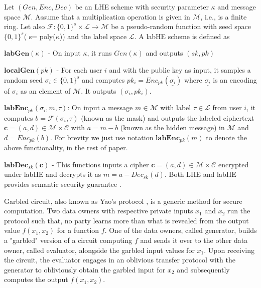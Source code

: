 Let $(Gen,Enc,Dec)$ be an \textsf{LHE} scheme with security parameter $\kappa$ and message space $\mathcal{M}$. Assume that a multiplication operation is given in $\mathcal{M}$, i.e., is a finite ring. Let also $\mathcal{F}:\{0,1\}^s \times \mathcal{L}\rightarrow \mathcal{M}$ be a pseudo-random function with seed space $\{0,1\}^s$( s= poly($\kappa $)) and the label space $\mathcal{L}$. A \textsf{labHE} scheme is defined as
\squishlist
 \item $\textbf{labGen}(\kappa)$ - On input $\kappa$, it runs $Gen(\kappa)$ and outputs $(sk,pk)$
\item $\textbf{localGen}(pk)$ -  For each user $i$ and with the public key as input, it samples a random seed $\sigma_i \in \{0,1\}^s$ and computes $pk_i = Enc_{pk}(\underline{\sigma_i})$ where $\underline{\sigma_i}$ is an  encoding of $\sigma_i$ as an  element of $\mathcal{M}$. It outputs $(\sigma_i,pk_i)$.
\item $\textbf{labEnc}_{pk}(\sigma_i, m , \tau)$: On input a message $m \in \mathcal{M} $ with label $\tau \in \mathcal{L}$  from user $i$, it computes $b=\mathcal{F}(\sigma_i, \tau)$ (known as the mask) and outputs the labeled ciphertext $\mathbf{c}=(a,d) \in \mathcal{M} \times \mathcal{C}$ with $ a= m- b$  (known as the hidden message) in $\mathcal{M}$ and $d=Enc_{pk}(b)$. For brevity we just use notation $\textbf{labEnc}_{pk}(m)$ to denote the above functionality, in the rest of paper. 
\item $\textbf{labDec}_{sk}(\mathbf{c})$ - This functions inputs a cipher $\mathbf{c}=(a,d) \in \mathcal{M} \times \mathcal{C}$ encrypted under  \textsf{labHE} and decrypts it as $m=a-Dec_{sk}(d)$.\squishend
Both \textsf{LHE} and \textsf{labHE} provides semantic security guarantee \cite{Katz}.

Garbled circuit, also known as Yao's protocol \cite{Yao,Yao2},  is a generic method for secure computation. Two data owners with respective private inputs $x_1$ and $x_2$ run the protocol such that, no party learns more  
than what is revealed from the output value $f(x_1,x_2)$ for a function $f$.  One of the data owners, called
generator, builds a "garbled" version of a circuit computing $f$ and sends it over to the other data owner, called evaluator, alongside the garbled input values for $x_1$.  Upon receiving the circuit, the evaluator 
engages in an oblivious transfer protocol with the generator to obliviously obtain the garbled input for $x_2$ and subsequently computes the  output $f(x_1, x_2)$.
